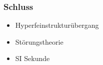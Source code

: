 \begin{frame}
\begin{figure}
\begin{tikzpicture}[font=\sffamily, scale=0.21, transform shape]
		
		
		
		\end{tikzpicture}
	\end{figure}
\end{frame}


\begin{frame}
  \frametitle{Schluss}

  \begin{itemize}
  \item Hyperfeinstrukturübergang
  \item Störungstheorie
  \item SI Sekunde
  \end{itemize}

\end{frame}



